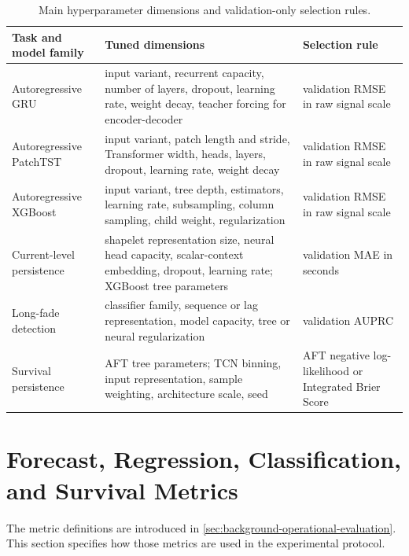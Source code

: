 \begin{table}[htbp]
  \centering
  \caption{Main hyperparameter dimensions and validation-only selection rules.}
  \label{tab:model-selection-dimensions}
  \small
  \setlength{\tabcolsep}{4pt}
  \renewcommand{\arraystretch}{1.25}
  \begin{tabular}{
    @{}
    >{\raggedright\arraybackslash}p{}
    >{\raggedright\arraybackslash}p{}
    >{\raggedright\arraybackslash}p{}
    @{}
  }
    \toprule
    Task and model family & Tuned dimensions & Selection rule \\
    \midrule
    Autoregressive GRU
      & input variant, recurrent capacity, number of layers, dropout, learning rate, weight decay, teacher forcing for encoder-decoder
      & validation RMSE in raw signal scale \\
    Autoregressive PatchTST
      & input variant, patch length and stride, Transformer width, heads, layers, dropout, learning rate, weight decay
      & validation RMSE in raw signal scale \\
    Autoregressive XGBoost
      & input variant, tree depth, estimators, learning rate, subsampling, column sampling, child weight, regularization
      & validation RMSE in raw signal scale \\
    Current-level persistence
      & shapelet representation size, neural head capacity, scalar-context embedding, dropout, learning rate; XGBoost tree parameters
      & validation MAE in seconds \\
    Long-fade detection
      & classifier family, sequence or lag representation, model capacity, tree or neural regularization
      & validation AUPRC \\
    Survival persistence
      & AFT tree parameters; TCN binning, input representation, sample weighting, architecture scale, seed
      & AFT negative log-likelihood or Integrated Brier Score \\
    \bottomrule
  \end{tabular}
\end{table}

\section{Forecast, Regression, Classification, and Survival Metrics}
\label{sec:native-task-metrics}

The metric definitions are introduced in
\cref{sec:background-operational-evaluation}. This section specifies how those
metrics are used in the experimental protocol.

